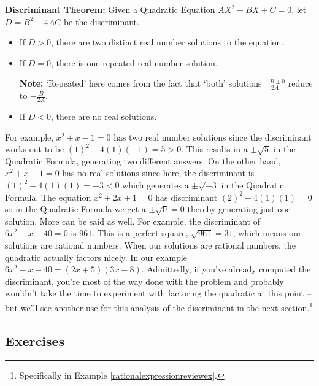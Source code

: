 \documentclass[10pt]{article}
\begin{document}
\medskip

\colorbox{ResultColor}{\bbm
\begin{thm} \textbf{Discriminant Theorem:} \label{discriminanttheoremrealversion} Given a Quadratic Equation $AX^2 + BX + C = 0$, let $D = B^2 - 4AC$ be the discriminant.

\begin{itemize}

\item  If $D > 0$, there are two distinct real number solutions to the equation. 

\item  If $D = 0$, there is one repeated real number solution.  

\textbf{Note:}  `Repeated' here comes from the fact that `both' solutions $\frac{-B \pm 0}{2A}$ reduce to $-\frac{B}{2A}$.

\item  If $D < 0$, there are no real solutions.

\end{itemize}

\end{thm}
\ebm}

\medskip

For example, $x^2 + x - 1 = 0$ has two real number solutions since the discriminant works out to be $(1)^2 - 4(1)(-1) = 5 > 0$.  This results in a $\pm \sqrt{5}$ in the Quadratic Formula, generating two different answers.  On the other hand, $x^2 + x + 1 = 0$ has no real solutions since here, the discriminant is $(1)^2 - 4(1)(1) = -3 < 0$ which generates a $\pm \sqrt{-3}$ in the Quadratic Formula.  The equation $x^2 + 2x +1 = 0$ has discriminant $(2)^2 - 4(1)(1) = 0$ so in the Quadratic Formula we get a $\pm \sqrt{0} = 0$ thereby  generating just one solution.  More can be said as well.  For example, the discriminant of $6x^2 - x - 40 = 0$ is $961$.  This is a perfect square, $\sqrt{961} = 31$, which means our solutions are rational numbers.  When our solutions are rational numbers, the quadratic actually factors nicely. In our example  $6x^2 - x - 40 = (2x+5)(3x-8)$.  Admittedly,  if you've already computed the discriminant, you're most of the way done with the problem and probably wouldn't take the time to experiment with factoring the quadratic at this point -- but we'll see another use for this analysis of the discriminant in the next section.\footnote{Specifically in Example \ref{rationalexpressionreviewex}.}

\newpage

\subsection{Exercises}
\end{document}
